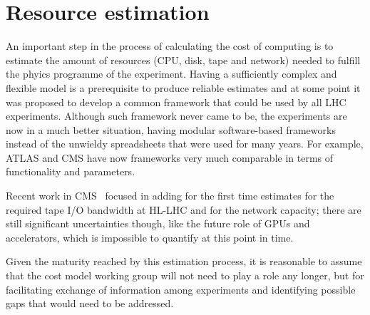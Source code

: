 \section{Resource estimation}
An important step in the process of calculating the cost of computing
is to estimate the amount of resources (CPU, disk, tape and network)
needed to fulfill the phyics programme of the experiment. Having a
sufficiently complex and flexible model is a prerequisite to produce
reliable estimates and at some point it was proposed to develop a common
framework that could be used by all LHC experiments. Although such
framework never came to be, the experiments are now in a much better
situation, having modular software-based frameworks instead of the
unwieldy spreadsheets that were used for many years. For example,
ATLAS and CMS have now frameworks very much comparable
in terms of functionality and parameters.

Recent work in CMS~\cite{cmsres} focused in adding for the first time
estimates for the required tape I/O bandwidth at HL-LHC and for the
network capacity; there are still significant uncertainties though,
like the future role of GPUs and accelerators, which is impossible to
quantify at this point in time.

Given the maturity reached by this estimation process, it is
reasonable to assume that the cost model working group will not need
to play a role any longer, but for facilitating exchange of
information among experiments and identifying possible gaps that would
need to be addressed.

